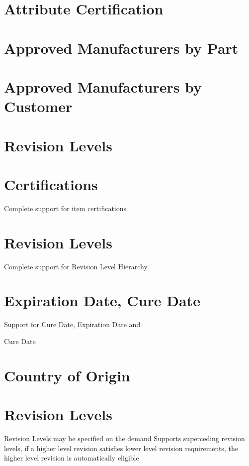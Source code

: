 \documentclass[letterpaper,10pt,english]{sphinxmanual}
\begin{document}
\section{Attribute Certification}
\label{APS/ApsFeatures:attribute-certification}

\section{Approved Manufacturers by Part}
\label{APS/ApsFeatures:approved-manufacturers-by-part}

\section{Approved Manufacturers by Customer}
\label{APS/ApsFeatures:approved-manufacturers-by-customer}

\section{Revision Levels}
\label{APS/ApsFeatures:revision-levels}

\section{Certifications}
\label{APS/ApsFeatures:id5}
Complete support for item certifications


\section{Revision Levels}
\label{APS/ApsFeatures:id6}
Complete support for Revision Level Hierarchy


\section{Expiration Date, Cure Date}
\label{APS/ApsFeatures:id7}
Support for Cure Date, Expiration Date and

Cure Date


\section{Country of Origin}
\label{APS/ApsFeatures:country-of-origin}

\section{Revision Levels}
\label{APS/ApsFeatures:id8}
Revision Levels may be specified on the demand Supports superceding
revision levels, if a higher level revision satisfies lower level
revision requirements, the higher level revision is automatically
eligible
\end{document}
